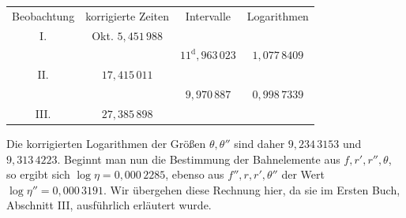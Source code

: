 \begin{center}
\small\setlength{\tabcolsep}{8pt}\renewcommand{\arraystretch}{.85}
\begin{tabular}{@{}cccc@{}}
Beobachtung & korrigierte Zeiten & Intervalle & Logarithmen\\[.5em]
I. & Okt. $5{,}451\,988$ & & \\
 & & $11^{\mathrm{d}}{,}963\,023$ & $1{,}077\,8409$\\
II. & $17{,}415\,011$ & & \\
 & & $9{,}970\,887$ & $0{,}998\,7339$\\
III. & $27{,}385\,898$ & & \\
\end{tabular}
\end{center}
\noindent Die korrigierten Logarithmen der Größen $\theta,\theta''$ sind daher $9{,}234\,3153$ und $9{,}313\,4223$. Beginnt man nun die Bestimmung der Bahnelemente aus $f,r',r'',\theta$, so ergibt sich $\log\eta=0{,}000\,2285$, ebenso aus $f'',r,r',\theta''$ der Wert $\log\eta''=0{,}000\,3191$. Wir übergehen diese Rechnung hier, da sie im Ersten Buch, Abschnitt III, ausführlich erläutert wurde.

